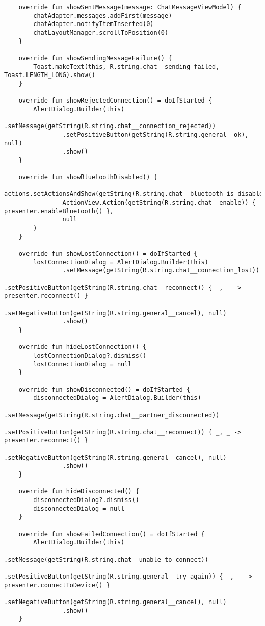 \begin{lstlisting}
    override fun showSentMessage(message: ChatMessageViewModel) {
        chatAdapter.messages.addFirst(message)
        chatAdapter.notifyItemInserted(0)
        chatLayoutManager.scrollToPosition(0)
    }

    override fun showSendingMessageFailure() {
        Toast.makeText(this, R.string.chat__sending_failed, Toast.LENGTH_LONG).show()
    }

    override fun showRejectedConnection() = doIfStarted {
        AlertDialog.Builder(this)
                .setMessage(getString(R.string.chat__connection_rejected))
                .setPositiveButton(getString(R.string.general__ok), null)
                .show()
    }

    override fun showBluetoothDisabled() {
        actions.setActionsAndShow(getString(R.string.chat__bluetooth_is_disabled),
                ActionView.Action(getString(R.string.chat__enable)) { presenter.enableBluetooth() },
                null
        )
    }

    override fun showLostConnection() = doIfStarted {
        lostConnectionDialog = AlertDialog.Builder(this)
                .setMessage(getString(R.string.chat__connection_lost))
                .setPositiveButton(getString(R.string.chat__reconnect)) { _, _ -> presenter.reconnect() }
                .setNegativeButton(getString(R.string.general__cancel), null)
                .show()
    }

    override fun hideLostConnection() {
        lostConnectionDialog?.dismiss()
        lostConnectionDialog = null
    }

    override fun showDisconnected() = doIfStarted {
        disconnectedDialog = AlertDialog.Builder(this)
                .setMessage(getString(R.string.chat__partner_disconnected))
                .setPositiveButton(getString(R.string.chat__reconnect)) { _, _ -> presenter.reconnect() }
                .setNegativeButton(getString(R.string.general__cancel), null)
                .show()
    }

    override fun hideDisconnected() {
        disconnectedDialog?.dismiss()
        disconnectedDialog = null
    }

    override fun showFailedConnection() = doIfStarted {
        AlertDialog.Builder(this)
                .setMessage(getString(R.string.chat__unable_to_connect))
                .setPositiveButton(getString(R.string.general__try_again)) { _, _ -> presenter.connectToDevice() }
                .setNegativeButton(getString(R.string.general__cancel), null)
                .show()
    }


\end{lstlisting}
